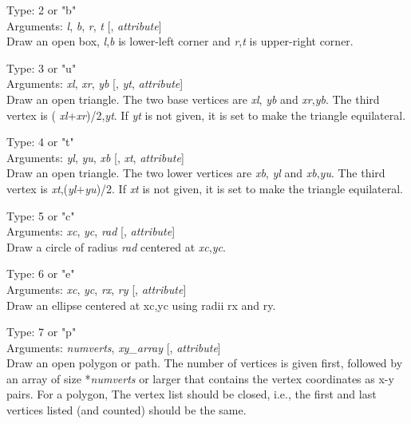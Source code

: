 \begin{description}
\begin{description}
\item{Type: 2 or {\vt "b"}\\
Arguments: {\it l\/}, {\it b\/}, {\it r\/}, {\it t\/} [, {\it attribute\/}]}\\
  Draw an open box, {\it l\/},{\it b\/} is lower-left corner and
 {\it r\/},{\it t\/} is upper-right corner.

\item{Type: 3 or {\vt "u"}\\
Arguments: {\it xl\/}, {\it xr\/}, {\it yb\/} [, {\it yt\/},
{\it attribute\/}]}\\
  Draw an open triangle.  The two base vertices are {\it xl\/},{\it
  yb\/} and {\it xr\/},{\it yb\/}.  The third vertex is ({\it
  xl\/}+{\it xr\/})/2,{\it yt\/}.  If {\it yt\/} is not given, it is
  set to make the triangle equilateral.

\item{Type: 4 or {\vt "t"}\\
Arguments: {\it yl\/}, {\it yu\/}, {\it xb\/} [, {\it xt\/},
{\it attribute\/}]}\\
  Draw an open triangle.  The two lower vertices are {\it xb\/},{\it
  yl\/} and {\it xb\/},{\it yu\/}.  The third vertex is {\it
  xt\/},({\it yl\/}+{\it yu\/})/2.  If {\it xt\/} is not given, it is
  set to make the triangle equilateral.

\item{Type: 5 or {\vt "c"}\\
Arguments: {\it xc\/}, {\it yc\/}, {\it rad\/} [, {\it attribute\/}]}\\
  Draw a circle of radius {\it rad\/} centered at {\it xc\/},{\it yc\/}.

\item{Type: 6 or {\vt "e"}\\
Arguments: {\it xc\/}, {\it yc\/}, {\it rx\/}, {\it ry\/}
[, {\it attribute\/}]}\\
  Draw an ellipse centered at xc,yc using radii rx and ry.

\item{Type: 7 or {\vt "p"}\\
Arguments: {\it numverts\/}, {\it xy\_array\/} [, {\it attribute\/}]}\\
  Draw an open polygon or path.  The number of vertices is given
  first, followed by an array of size {*}{\it numverts} or larger
  that contains the vertex coordinates as x-y pairs.  For a polygon,
  The vertex list should be closed, i.e., the first and last vertices
  listed (and counted) should be the same.


\end{description}
\end{description}
